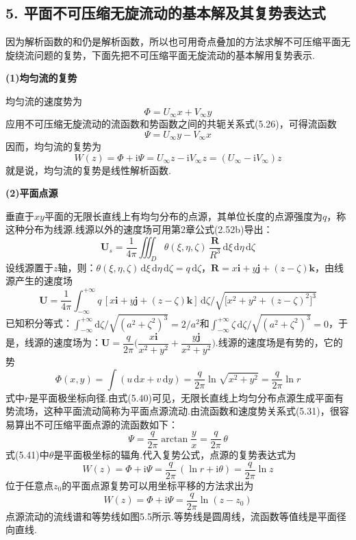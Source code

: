 \subsection*{5. 平面不可压缩无旋流动的基本解及其复势表达式}

因为解析函数的和仍是解析函数，所以也可用奇点叠加的方法求解不可压缩平面无旋绕流问题的复势，下面先把不可压缩平面无旋流动的基本解用复势表示.

\textbf{(1)均匀流的复势}

均匀流的速度势为
\[
\Phi=U_\infty x+V_\infty y
\]
应用不可压缩无旋流动的流函数和势函数之间的共轭关系式(5.26)，可得流函数
\[
\Psi=U_\infty y-V_\infty x
\]
因而，均匀流的复势为
\begin{equation*}
W(z)=\Phi+\mathrm{i}\Psi=U_\infty z-\mathrm{i}V_\infty z=(U_\infty-\mathrm{i}V_\infty)z
\tag{5.39}
\end{equation*}
就是说，均匀流的复势是线性解析函数.

\textbf{(2)平面点源}

垂直于$xy$平面的无限长直线上有均匀分布的点源，其单位长度的点源强度为$q$，称这种分布为线源.线源以外的速度场可用第2章公式(2.52b)导出：
\[
\boldsymbol{U}_s=\frac{1}{4\pi}\iiint_D\theta(\xi,\eta,\zeta)\,\frac{\boldsymbol{R}}{R^{3}}\,\mathrm{d}\xi\,\mathrm{d}\eta\,\mathrm{d}\zeta
\]
设线源置于$z$轴，则：$\theta(\xi,\eta,\zeta)\,\mathrm{d}\xi\,\mathrm{d}\eta\,\mathrm{d}\zeta=q\,\mathrm{d}\zeta$，$\boldsymbol{R}=x\boldsymbol{i}+y\boldsymbol{j}+(z-\zeta)\boldsymbol{k}$，由线源产生的速度场
\[
\boldsymbol{U}=\frac{1}{4\pi}\int_{-\infty}^{+\infty}q\,[x\boldsymbol{i}+y\boldsymbol{j}+(z-\zeta)\boldsymbol{k}]\,\mathrm{d}\zeta\big/\sqrt{\big[x^{2}+y^{2}+(z-\zeta)^{2}\big]^{3}}
\]
已知积分等式：$\displaystyle\int_{-\infty}^{+\infty}\mathrm{d}\zeta\big/\sqrt{(a^{2}+\zeta^{2})^{3}}=2/a^{2}$和$\displaystyle\int_{-\infty}^{+\infty}\zeta\,\mathrm{d}\zeta\big/\sqrt{(a^{2}+\zeta^{2})^{3}}=0$，于是，线源的速度场为：$\boldsymbol{U}=\dfrac{q}{2\pi}\Big(\dfrac{x\boldsymbol{i}}{x^{2}+y^{2}}+\dfrac{y\boldsymbol{j}}{x^{2}+y^{2}}\Big)$.线源的速度场是有势的，它的势
\begin{equation*}
\Phi(x,y)=\int( u\,\mathrm{d}x+v\,\mathrm{d}y)=\frac{q}{2\pi}\ln\sqrt{x^{2}+y^{2}}=\frac{q}{2\pi}\ln r
\tag{5.40}
\end{equation*}
式中$r$是平面极坐标向径.由式(5.40)可见，无限长直线上均匀分布点源生成平面有势流场，这种平面流动简称为平面点源流动.由流函数和速度势关系式(5.31)，很容易算出不可压缩平面点源的流函数如下：
\begin{equation*}
\Psi=\frac{q}{2\pi}\arctan\frac{y}{x}=\frac{q}{2\pi}\,\theta
\tag{5.41}
\end{equation*}
式(5.41)中$\theta$是平面极坐标的辐角.代入复势公式，点源的复势表达式为
\begin{equation*}
W(z)=\Phi+\mathrm{i}\Psi=\frac{q}{2\pi}\,(\ln r+\mathrm{i}\theta)=\frac{q}{2\pi}\ln z
\tag{5.42a}
\end{equation*}
位于任意点$z_0$的平面点源复势可以用坐标平移的方法求出为
\begin{equation*}
W(z)=\Phi+\mathrm{i}\Psi=\frac{q}{2\pi}\ln(z-z_0)
\tag{5.42b}
\end{equation*}
点源流动的流线谱和等势线如图5.5所示.等势线是圆周线，流函数等值线是平面径向直线.

